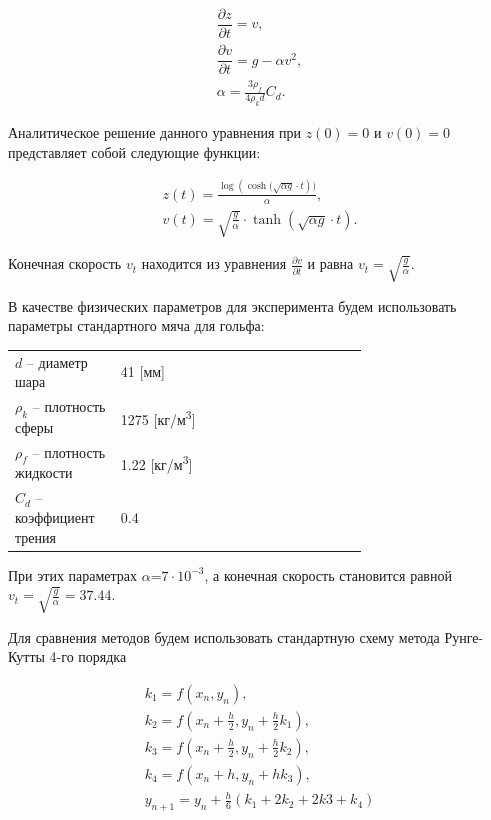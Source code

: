 \documentclass[master, och, times, pract]{sty/SCWorks}
\theoremstyle{plain}
\theoremstyle{definition}
\numberwithin{equation}{section}
\begin{document}
\begin{equation}
\begin{aligned}
\dfrac{\partial z}{ \partial t} = v, \\
\dfrac{\partial v}{ \partial t} = g - \alpha v^2, \\
\alpha = \frac{3\rho_f}{4\rho_k d}C_d.
\end{aligned}
\end{equation}

\noindent Аналитическое решение данного уравнения при $z(0)=0$ и $v(0)=0$ представляет собой следующие функции:

\begin{equation}
\begin{aligned}
z(t)=\frac{\log{(\cosh{(\sqrt{\alpha g} \cdot t})})}{\alpha}, \\
v(t)=\sqrt{\frac{g}{\alpha}} \cdot \tanh{(\sqrt{\alpha g} \cdot t)}.
\end{aligned}
\end{equation}

\noindent Конечная скорость $v_t$ находится из уравнения $\frac{\partial v}{ \partial t}$ и равна $v_t=\sqrt{\frac{g}{\alpha}}$.

В качестве физических параметров для эксперимента будем использовать параметры стандартного мяча для гольфа:

\begin{threeparttable}
\begin{longtable}[H]{lp{0.7\linewidth}}
{$d$} -- диаметр шара & 41 [мм] \\
{$\rho_k$} -- плотность сферы & 1275 [кг/м\textsuperscript{3}] \\
{$\rho_f$} -- плотность жидкости & 1.22 [кг/м\textsuperscript{3}] \\
{$C_d$} -- коэффициент трения & 0.4
\end{longtable}
\end{threeparttable}


При этих параметрах $\alpha$=$7 \cdot 10^{-3}$, а конечная скорость становится равной $v_t=\sqrt{\frac{g}{\alpha}}=37.44$.

Для сравнения методов будем использовать стандартную схему метода Рунге-Кутты 4-го порядка

\begin{equation}%
\begin{aligned}
k_1 = f(x_n, y_n), \\
k_2 = f(x_n+\frac{h}{2}, y_n+\frac{h}{2}k_1), \\
k_3 = f(x_n+\frac{h}{2}, y_n+\frac{h}{2}k_2), \\
k_4 = f(x_n+h, y_n+hk_3), \\
y_{n+1}=y_n+\frac{h}{6}(k_1+2k_2+2k3+k_4)
\end{aligned}
\end{equation}
\end{document}
